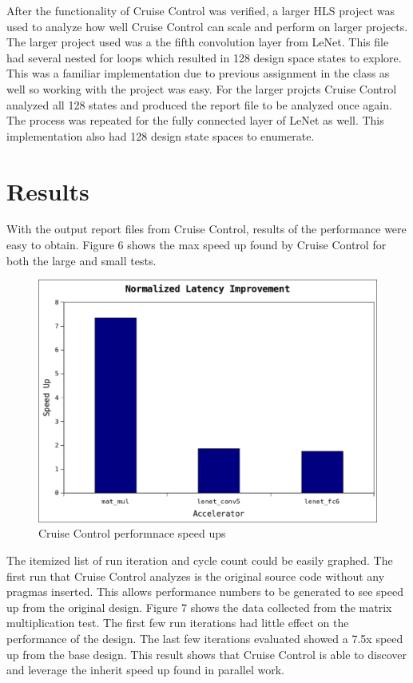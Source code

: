 \documentclass[letterpaper, 10 pt, conference]{IEEEconf}  %
\begin{document}
After the functionality of Cruise Control was verified, a larger HLS project was used to analyze how well Cruise Control can scale and perform on larger projects. The larger project used was a the fifth convolution layer from LeNet. This file had several nested for loops which resulted in 128 design space states to explore. This was a familiar implementation due to previous assignment in the class as well so working with the project was easy. For the larger projcts Cruise Control analyzed all 128 states and produced the report file to be analyzed once again. The process was repeated for the fully connected layer of LeNet as well. This implementation also had 128 design state spaces to enumerate.  


\section{Results}
With the output report files from Cruise Control, results of the performance were easy to obtain. Figure 6 shows the max speed up found by Cruise Control for both the large and small tests. 

\begin{figure}[H]
\centering
\includegraphics[scale=.4]{result0.png} 
\caption{Cruise Control performnace speed ups}
\end{figure}

The itemized list of run iteration and cycle count could be easily graphed. The first run that Cruise Control analyzes is the original source code without any pragmas inserted. This allows performance numbers to be generated to see speed up from the original design. Figure 7 shows the data collected from the matrix multiplication test. The first few run iterations had little effect on the performance of the design. The last few iterations evaluated showed a 7.5x speed up from the base design. This result shows that Cruise Control is able to discover and leverage the inherit speed up found in parallel work. \newline 
\end{document}
